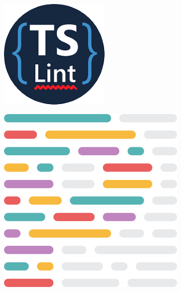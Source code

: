  \begin{figure}[ht]
    \centering
    \begin{subfigure}[b]{0.12\textwidth}
        \includegraphics[width=\textwidth]{mem/images/cap-4/4.1.2(desarrollo)/tslint-logo.png}
        \label{fig:tslint}
    \end{subfigure}
    \quad
    \begin{subfigure}[b]{0.12\textwidth}
       \includegraphics[width=\textwidth]{mem/images/cap-4/4.1.2(desarrollo)/prettier-logo.png}

\end{subfigure}
\end{figure}
